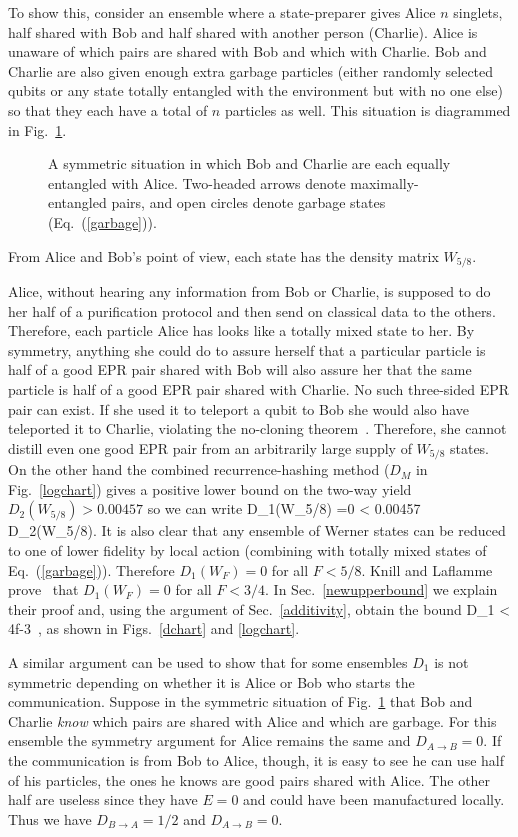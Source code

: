 To show this, consider an ensemble where a state-preparer gives Alice
$n$ singlets, half shared with Bob and half shared with another person
(Charlie).  Alice is unaware of which pairs are shared with Bob
and which with Charlie.  Bob and Charlie are also given enough extra
garbage particles (either randomly selected qubits or any state
totally entangled with the environment but with no one else) so that
they each have a total of $n$ particles as well.  This situation is
diagrammed in Fig.~\ref{abc}.
\begin{figure}[htbf]
\centerline{}
\caption[A symmetric situation]
{A symmetric situation in which Bob and Charlie are
each equally entangled with Alice.  Two-headed arrows denote
maximally-entangled pairs, and open circles denote garbage states
(Eq.~(\protect\ref{garbage})).
\label{abc}}
\end{figure}
From Alice and Bob's point of view,
each state has the density matrix $W_{5/8}$.
 
Alice, without hearing any information from Bob or Charlie, is
supposed to do her half of a purification protocol and then send on
classical data to the others.  Therefore, each particle Alice has looks
like a totally mixed state to her.  By symmetry, anything she could do
to assure herself that a particular particle is half of a good EPR
pair shared with Bob will also assure her that the same particle is
half of a good EPR pair shared with Charlie.  No such three-sided EPR
pair can exist.  If she used it to teleport a qubit to Bob she would
also have teleported it to Charlie, violating the no-cloning
theorem~\cite{WZ}.  Therefore, she cannot distill even one good EPR
pair from an arbitrarily large supply of $W_{5/8}$ states.  On the
other hand the combined recurrence-hashing method ($D_M$ in
Fig.~\ref{logchart}) gives a positive lower bound on the two-way yield
$D_2(W_{5/8}) > 0.00457$ so we can write
\beq
 D_1(W_{5/8}) =0 < 0.00457 \leq D_2(W_{5/8}).
\label{d10}
\eeq
It is also clear that any ensemble of Werner states can be
reduced to one of lower fidelity by local action (combining with
totally mixed states of Eq.~(\ref{garbage})).  Therefore $D_1(W_F)=0$
for all $F<5/8$.  Knill and Laflamme prove~\cite{lafknill} that
$D_1(W_F)=0$ for all $F<3/4$.  In Sec.~\ref{newupperbound} we 
explain their proof and, using the argument of Sec.~\ref{additivity},
obtain the bound
\beq
D_1 < 4f-3\ ,
\eeq 
as shown in Figs.~\ref{dchart} and \ref{logchart}.

A similar argument can be used to show that for some ensembles
$D_1$ is not symmetric depending on whether it is Alice or
Bob who starts the communication.  Suppose in the symmetric
situation of Fig.~\ref{abc} that Bob and Charlie {\em know} which
pairs are shared with Alice and which are garbage.  For this
ensemble the symmetry argument for Alice remains the same and
$D_{A\rightarrow B}=0$.  If the communication is from Bob to Alice,
though, it is easy to see he can use half of his particles, the
ones he knows are good pairs shared with Alice.  The other half
are useless since they have $E=0$ and could have been manufactured
locally.  Thus we have $D_{B\rightarrow A}=1/2$ and
$D_{A\rightarrow B}=0$.
 
